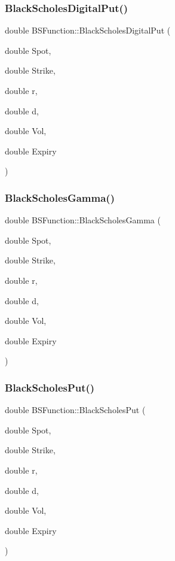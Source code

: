 \subsubsection{\texorpdfstring{Black\+Scholes\+Digital\+Put()}{BlackScholesDigitalPut()}}
{\footnotesize\ttfamily double B\+S\+Function\+::\+Black\+Scholes\+Digital\+Put (\begin{DoxyParamCaption}\item[{double}]{Spot,  }\item[{double}]{Strike,  }\item[{double}]{r,  }\item[{double}]{d,  }\item[{double}]{Vol,  }\item[{double}]{Expiry }\end{DoxyParamCaption})}

\hypertarget{namespaceBSFunction_a9bdd662c36e0aea60fc9a2fea306a777}{}\label{namespaceBSFunction_a9bdd662c36e0aea60fc9a2fea306a777} 
\subsubsection{\texorpdfstring{Black\+Scholes\+Gamma()}{BlackScholesGamma()}}
{\footnotesize\ttfamily double B\+S\+Function\+::\+Black\+Scholes\+Gamma (\begin{DoxyParamCaption}\item[{double}]{Spot,  }\item[{double}]{Strike,  }\item[{double}]{r,  }\item[{double}]{d,  }\item[{double}]{Vol,  }\item[{double}]{Expiry }\end{DoxyParamCaption})}

\hypertarget{namespaceBSFunction_a363017016ff6d3746da2a672f985f253}{}\label{namespaceBSFunction_a363017016ff6d3746da2a672f985f253} 
\subsubsection{\texorpdfstring{Black\+Scholes\+Put()}{BlackScholesPut()}}
{\footnotesize\ttfamily double B\+S\+Function\+::\+Black\+Scholes\+Put (\begin{DoxyParamCaption}\item[{double}]{Spot,  }\item[{double}]{Strike,  }\item[{double}]{r,  }\item[{double}]{d,  }\item[{double}]{Vol,  }\item[{double}]{Expiry }\end{DoxyParamCaption})}

